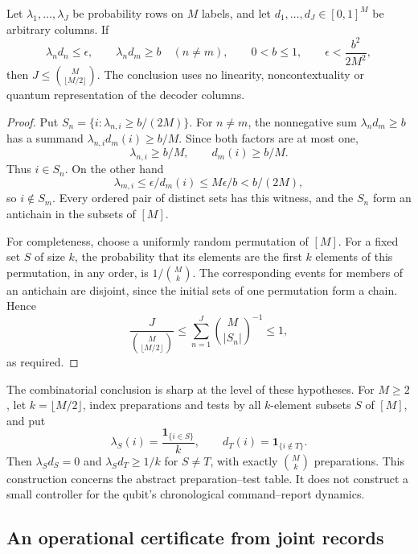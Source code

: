 \begin{lemma}
\label{lem:r77-robust-antichain}
Let $\lambda_1,\ldots,\lambda_J$ be probability rows on $M$ labels,
and let $d_1,\ldots,d_J\in[0,1]^M$ be arbitrary columns.  If
\begin{equation}\label{eq:r77-antichain-hypotheses}
 \lambda_n d_n\le\epsilon,
 \qquad \lambda_n d_m\ge b\quad(n\ne m),
 \qquad 0<b\le1,
 \qquad \epsilon<\frac{b^2}{2M^2},
\end{equation}
then $J\le\binom{M}{\lfloor M/2\rfloor}$.
The conclusion uses no linearity, noncontextuality or quantum
representation of the decoder columns.
\end{lemma}
\begin{proof}
Put $S_n=\{i:\lambda_{n,i}\ge b/(2M)\}$.  For $n\ne m$, the
nonnegative sum $\lambda_nd_m\ge b$ has a summand
$\lambda_{n,i}d_m(i)\ge b/M$.  Since both factors are at most one,
\[
 \lambda_{n,i}\ge b/M,\qquad d_m(i)\ge b/M.
\]
Thus $i\in S_n$.  On the other hand
\[
 \lambda_{m,i}\le\epsilon/d_m(i)
                \le M\epsilon/b<b/(2M),
\]
so $i\notin S_m$.  Every ordered pair of distinct sets has this
witness, and the $S_n$ form an antichain in the subsets of $[M]$.

For completeness, choose a uniformly random permutation of $[M]$.
For a fixed set $S$ of size $k$, the probability that its elements
are the first $k$ elements of this permutation, in any order, is
$1/\binom{M}{k}$.  The corresponding events for members of an
antichain are disjoint, since the initial sets of one permutation
form a chain.  Hence
\[
 \frac{J}{\binom{M}{\lfloor M/2\rfloor}}
 \le\sum_{n=1}^J\binom{M}{|S_n|}^{-1}\le1,
\]
as required.
\end{proof}

The combinatorial conclusion is sharp at the level of these hypotheses.
For $M\ge2$, let $k=\lfloor M/2\rfloor$, index preparations and
tests by all $k$-element subsets $S$ of $[M]$, and put
\[
 \lambda_S(i)=\frac{\mathbf1_{\{i\in S\}}}{k},
 \qquad d_T(i)=\mathbf1_{\{i\notin T\}}.
\]
Then $\lambda_Sd_S=0$ and $\lambda_Sd_T\ge1/k$ for $S\ne T$, with
exactly $\binom{M}{k}$ preparations.  This construction concerns the
abstract preparation--test table.  It does not construct a small
controller for the qubit's chronological command--report dynamics.

\subsection{An operational certificate from joint records}

